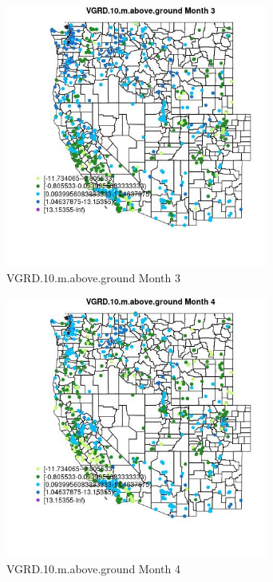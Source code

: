 \begin{figure} 
\centering  
\includegraphics[width=0.77\textwidth]{Code_Outputs/Report_ML_input_PM25_Step4_part_f_de_duplicated_aves_prioritize_24hr_obswNAs_MapObsMo3VGRD10maboveground.jpg} 
\caption{\label{fig:Report_ML_input_PM25_Step4_part_f_de_duplicated_aves_prioritize_24hr_obswNAsMapObsMo3VGRD10maboveground}VGRD.10.m.above.ground Month 3} 
\end{figure} 
 

\clearpage 

\begin{figure} 
\centering  
\includegraphics[width=0.77\textwidth]{Code_Outputs/Report_ML_input_PM25_Step4_part_f_de_duplicated_aves_prioritize_24hr_obswNAs_MapObsMo4VGRD10maboveground.jpg} 
\caption{\label{fig:Report_ML_input_PM25_Step4_part_f_de_duplicated_aves_prioritize_24hr_obswNAsMapObsMo4VGRD10maboveground}VGRD.10.m.above.ground Month 4} 
\end{figure} 
 

